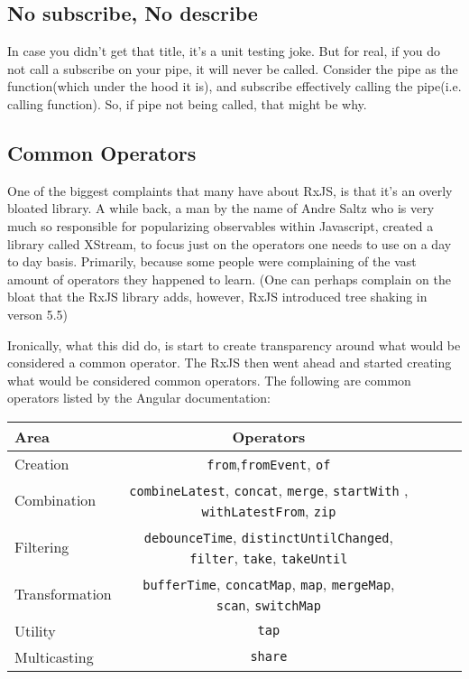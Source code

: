 \subsection{No subscribe, No describe}
In case you didn't get that title, it's a unit testing joke. But for real, if 
you do not call a subscribe on your pipe, it will never be called. Consider the
pipe as the function(which under the hood it is), and subscribe effectively
calling the pipe(i.e. calling function). So, if pipe not being called, that 
might be why.

\subsection{Common Operators}
One of the biggest complaints that many have about RxJS, is that it's an 
overly bloated library. A while back, a man by the name of Andre Saltz who is
very much so responsible for popularizing observables within Javascript, 
created a library called XStream, to focus just on the operators one needs to 
use on a day to day basis. Primarily, because some people were complaining of 
the vast amount of operators they happened to learn. (One can perhaps complain
on the bloat that the RxJS library adds, however, RxJS introduced tree shaking
in verson 5.5)

Ironically, what this did do, is start to create transparency around what 
would be considered a common operator. The RxJS then went ahead and started 
creating what would be considered common operators. The following are common 
operators listed by the Angular documentation:
  
\begin{center}
  \begin{tabular}{@{} l *4c @{}}
    \toprule
    {\color{red}Area} & Operators \\
    \midrule
    Creation & \texttt{from},\texttt{fromEvent}, \texttt{of}\tabularnewline
    Combination & \texttt{combineLatest}, \texttt{concat}, \texttt{merge},
  \texttt{startWith} , \texttt{withLatestFrom},
  \texttt{zip}\tabularnewline
  Filtering & \texttt{debounceTime}, \texttt{distinctUntilChanged},
  \texttt{filter}, \texttt{take}, \texttt{takeUntil}\tabularnewline
  Transformation & \texttt{bufferTime}, \texttt{concatMap}, \texttt{map},
  \texttt{mergeMap}, \texttt{scan}, \texttt{switchMap}\tabularnewline
  Utility & \texttt{tap}\tabularnewline
  Multicasting & \texttt{share}\tabularnewline
  \end{tabular}
\end{center}  

